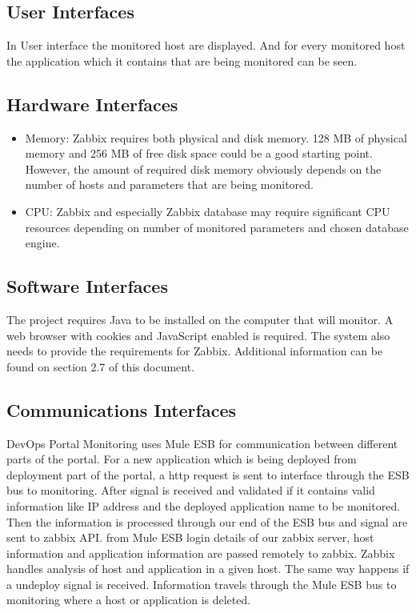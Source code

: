 \documentclass{article}
\begin{document}
\subsection{User Interfaces}

In User interface the monitored host are displayed. And for every monitored host the application which it contains that are being monitored can be seen.
\subsection{Hardware Interfaces}
\begin{itemize}
\item[]Memory:
    Zabbix requires both physical and disk memory. 128 MB of physical memory and 256 MB of free disk space could be a good starting point. However, the amount of required disk memory obviously depends on the number of hosts and parameters that are being monitored.
\item[]CPU:
   Zabbix and especially Zabbix database may require significant CPU resources depending on number of monitored parameters and chosen database engine.
\end{itemize}
\subsection{Software Interfaces}

     The project requires Java to be installed on the computer that will monitor. A web browser with cookies and JavaScript enabled is required. The system also needs to provide the requirements for Zabbix. Additional information can be found on section 2.7 of this document.

\subsection{Communications Interfaces}

DevOps Portal Monitoring uses Mule ESB for communication between different parts of the portal. For a new application which is being deployed from deployment part of the portal, a http request is sent to interface through the ESB bus to monitoring. After signal is received and validated if it contains valid information like IP address and the deployed application name to be monitored. Then the information is processed through our end of the ESB bus and signal are sent to zabbix API. from Mule ESB login details of our zabbix server, host information and application information are passed remotely to zabbix. Zabbix handles analysis of host and application in a given host. The same way happens if a undeploy signal is received. Information travels through the Mule ESB bus to monitoring where a host or application is deleted.
\end{document}
